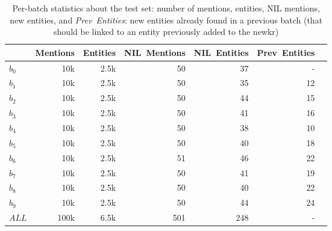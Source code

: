 \begin{table}[htbp]
    \centering
    \caption{Per-batch statistics about the test set: number of mentions, entities, NIL mentions, new entities, and \emph{Prev~Entities}: new entities already found in a previous batch (that should be linked to an entity previously added to the \ac{newkr})}
    \label{tab:dataset_stats_extended}
\begin{tabular}{l|rrrrrr}
\toprule
{} &  \textbf{Mentions} &  \textbf{Entities} &  N\textbf{IL~Mentions}  &    \textbf{NIL~Entities} &  \textbf{Prev~Entities} \\
\midrule
$b_0$  &          10k &           2.5k &                 50 &                      37 &                                          - &                                          \\
$b_1$  &          10k &           2.5k &                 50 &                      35 &                                         12 &                                          \\
$b_2$  &          10k &           2.5k &                 50 &                      44 &                                         15 &                                          \\
$b_3$  &          10k &           2.5k &                 50 &                      41 &                                         16 &                                          \\
$b_4$  &          10k &           2.5k &                 50 &                      38 &                                         10 &                                          \\
$b_5$  &          10k &           2.5k &                 50 &                      40 &                                         18 &                                          \\
$b_6$  &          10k &           2.5k &                 51 &                      46 &                                         22 &                                          \\
$b_7$  &          10k &           2.5k &                 50 &                      41 &                                         19 &                                          \\
$b_8$  &          10k &           2.5k &                 50 &                      40 &                                         22 &                                          \\
$b_9$  &          10k &           2.5k &                 50 &                      44 &                                         24 &                                          \\
$ALL$ &         100k &           6.5k &                501 &                     248 &                                          - &                                          \\
\bottomrule
\end{tabular}
\end{table}

